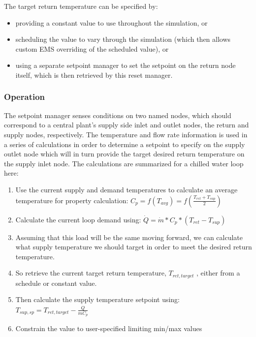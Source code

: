 The target return temperature can be specified by:

\begin{itemize}
\item
  providing a constant value to use throughout the simulation, or
\item
  scheduling the value to vary through the simulation (which then allows custom EMS overriding of the scheduled value), or
\item
  using a separate setpoint manager to set the setpoint on the return node itself, which is then retrieved by this reset manager.
\end{itemize}

\subsubsection{Operation}\label{operation}

The setpoint manager senses conditions on two named nodes, which should correspond to a central plant's supply side inlet and outlet nodes, the return and supply nodes, respectively. The temperature and flow rate information is used in a series of calculations in order to determine a setpoint to specify on the supply outlet node which will in turn provide the target desired return temperature on the supply inlet node. The calculations are summarized for a chilled water loop here:

\begin{enumerate}
\def\labelenumi{\arabic{enumi}.}
\item
  Use the current supply and demand temperatures to calculate an average temperature for property calculation: \(C_p = f\left(T_{avg}\right) = f\left(\frac{T_{ret}+T_{sup}}{2}\right)\)
\item
  Calculate the current loop demand using: \(\dot{Q} = \dot{m} * C_p * \left(T_{ret} - T_{sup}\right)\)
\item
  Assuming that this load will be the same moving forward, we can calculate what supply temperature we should target in order to meet the desired return temperature.
\item
  So retrieve the current target return temperature, \(T_{ret,target}\) , either from a schedule or constant value.
\item
  Then calculate the supply temperature setpoint using: \(T_{sup,sp} = T_{ret,target} - \frac{\dot{Q}}{\dot{m} C_p}\)
\item
  Constrain the value to user-specified limiting min/max values
\end{enumerate}

